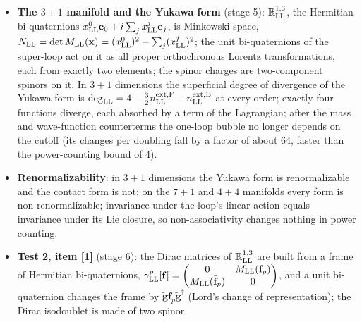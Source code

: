 \documentclass[
  10pt,
]{article}
\begin{document}
\begin{itemize}
  of length \(\zeta_{\rm LL}\): unitary condensates are exactly those
  whose pairs have the average isospin, and hence the average charge, 0;
  the unbroken generator of a unitary condensate is the isospin rotation
  about its real direction (\(Q_{\rm LL}=T^3_{\rm LL}\) for the polar
  condensate along the third axis), that of the charged up-up condensate
  is the number of down particles \(\tfrac12F_{\rm LL}-T^3_{\rm LL}\);
  the singlet of the whole super-loop is the scalar part of the product
  of two spinor charges, one half of a trace with two antisymmetric
  contractions, symmetric and therefore zero for one fermion field.
\item
  \textbf{The \(3+1\) manifold and the Yukawa form} (stage 5):
  \(\mathbb R^{1,3}_{\rm LL}\), the Hermitian bi-quaternions
  \(x^0_{\rm LL}\mathbf e_0+i\sum_jx^j_{\rm LL}\mathbf e_j\), is
  Minkowski space,
  \(N_{\rm LL}=\det M_{\rm LL}(\mathbf x)=(x^0_{\rm LL})^2-\sum_j(x^j_{\rm LL})^2\);
  the unit bi-quaternions of the super-loop act on it as all proper
  orthochronous Lorentz transformations, each from exactly two elements;
  the spinor charges are two-component spinors on it. In \(3+1\)
  dimensions the superficial degree of divergence of the Yukawa form is
  \(\deg_{\rm LL}=4-\tfrac32n^{\rm ext,F}_{\rm LL}-n^{\rm ext,B}_{\rm LL}\)
  at every order; exactly four functions diverge, each absorbed by a
  term of the Lagrangian; after the mass and wave-function counterterms
  the one-loop bubble no longer depends on the cutoff (its changes per
  doubling fall by a factor of about 64, faster than the power-counting
  bound of 4).
\item
  \textbf{Renormalizability}: in \(3+1\) dimensions the Yukawa form is
  renormalizable and the contact form is not; on the \(7+1\) and \(4+4\)
  manifolds every form is non-renormalizable; invariance under the
  loop's linear action equals invariance under its Lie closure, so
  non-associativity changes nothing in power counting.
\item
  \textbf{Test 2, item {[}1{]}} (stage 6): the Dirac matrices of
  \(\mathbb R^{1,3}_{\rm LL}\) are built from a frame of Hermitian
  bi-quaternions,
  \(\gamma^p_{\rm LL}[\mathbf f]=\begin{pmatrix}0&M_{\rm LL}(\mathbf f_p)\\M_{\rm LL}(\bar{\mathbf f}_p)&0\end{pmatrix}\),
  and a unit bi-quaternion changes the frame by
  \(\tilde{\mathbf g}\mathbf f_p\tilde{\mathbf g}^\dagger\) (Lord's
  change of representation); the Dirac isodoublet is made of two spinor

\end{itemize}
\end{document}
